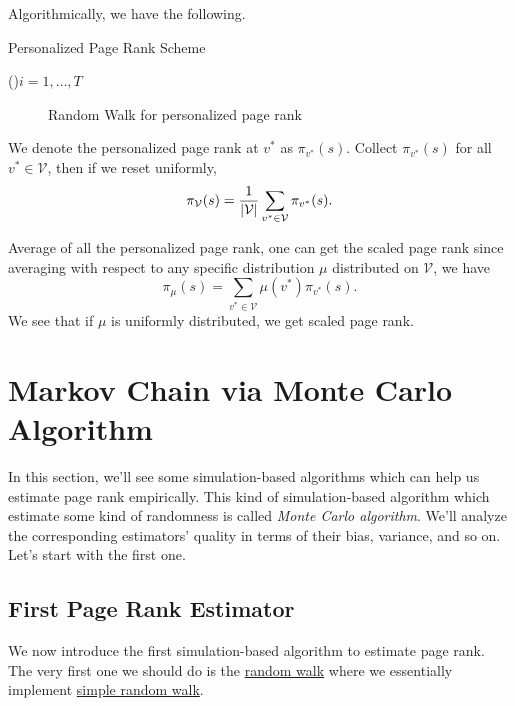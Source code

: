 Algorithmically, we have the following.
\par
\begin{algorithm}[H]\label{algo:personalized-page-rank-scheme}
	\DontPrintSemicolon
	\caption{Personalized Page Rank Scheme}
	\BlankLine

	\For(){\(i = 1, \ldots, T\)}{
	}
	\Return{}\;
\end{algorithm}
\begin{figure}[H]
	\centering
	\caption{Random Walk for personalized page rank}
	\label{fig:personalized-pagerank}
\end{figure}

We denote the personalized page rank at \(v^{\ast} \) as \(\pi_{v^{\ast}}(s)\). Collect \(\pi_{v^{\ast}}(s)\) for all \(v^{\ast}\in\mathcal{V}\),
then if we reset uniformly,
\[
	\pi_{\mathcal{\MakeUppercase{v}}} (s) = \frac{1}{\left\vert \mathcal{\MakeUppercase{v}} \right\vert }\sum\limits_{v^{\ast}\in\mathcal{V}} \pi_{v^{\ast}}(s).
\]

\begin{remark}
	Average of all the personalized page rank, one can get the scaled page rank
	since averaging with respect to any specific distribution \(\mu\) distributed on \(\mathcal{V}\), we have
	\[
		\pi_\mu(s) = \sum\limits_{v^{\ast}\in \mathcal{V}} \mu(v^{\ast})\pi_{v^{\ast}}(s).
	\]
	We see that if \(\mu\) is uniformly distributed, we get scaled page rank.
\end{remark}

\section{Markov Chain via Monte Carlo Algorithm}
In this section, we'll see some simulation-based algorithms which can help us estimate page rank empirically. This kind of simulation-based algorithm which
estimate some kind of randomness is called \emph{Monte Carlo algorithm}. We'll analyze the corresponding estimators' quality in terms of their bias, variance,
and so on. Let's start with the first one.

\subsection{First Page Rank Estimator}
We now introduce the first simulation-based algorithm to estimate page rank. The very first one we should do is the \hyperref[algo:random-walk-algorithm]{random walk}
where we essentially implement \hyperref[def:simple-random-walk]{simple random walk}.

